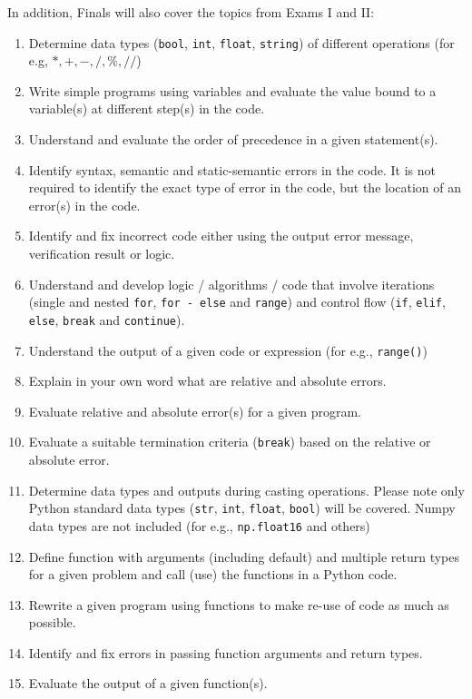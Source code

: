 \documentclass[]{article}
\begin{document}
In addition, Finals will also cover the topics from Exams I and II:

\begin{enumerate}
	\item Determine data types (\verb|bool|, \verb|int|, \verb|float|, \verb|string|) of different operations (for e.g, $*, +, -, /, \%, //$)
	\item Write simple programs using variables and evaluate the value bound to a variable(s) at different step(s) in the code.
	\item Understand and evaluate the order of precedence in a given statement(s).
	\item Identify syntax, semantic and static-semantic errors in the code. It is not required to identify the exact type of error in the code, but the location of an error(s) in the code.
	\item Identify and fix incorrect code either using the output error message, verification result or logic.
	\item Understand and develop logic / algorithms / code that involve iterations (single and nested \verb|for|, \verb|for - else| and \verb|range|) and control flow (\verb|if|, \verb|elif|, \verb|else|, \verb|break| and \verb|continue|).
	\item Understand the output of a given code or expression (for e.g., \verb|range()|)
	\item Explain in your own word what are relative and absolute errors.
	\item Evaluate relative and absolute error(s) for a given program. 
	\item Evaluate a suitable termination criteria (\verb|break|) based on the relative or absolute error.	
	\item Determine data types and outputs during casting operations. Please note only Python standard data types (\verb|str|, \verb|int|, \verb|float|, \verb|bool|) will be covered. Numpy data types are not included (for e.g., \verb|np.float16| and others)
	\item Define function with arguments (including default) and multiple return types for a given problem and call (use) the functions in a Python code.
	\item Rewrite a given program using functions to make re-use of code as much as possible.
	\item Identify and fix errors in passing function arguments and return types.
	\item Evaluate the output of a given function(s).

\end{enumerate}
\end{document}
